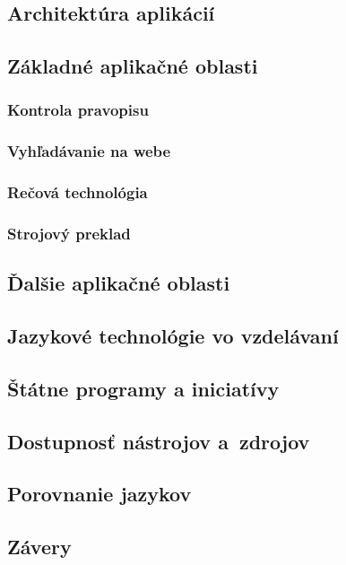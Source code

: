 \documentclass[]{../metanetpaper}
\begin{document}
\begin{multicols}{2}

\subsection{Architektúra aplikácií}

\subsection{Základné aplikačné oblasti}
\subsubsection{Kontrola pravopisu}

\subsubsection{Vyhľadávanie na webe}

\subsubsection{Rečová technológia}

\subsubsection{Strojový preklad}

\subsection{Ďalšie aplikačné oblasti}

\subsection{Jazykové technológie vo vzdelávaní}

\subsection{Štátne programy a iniciatívy}

\subsection{Dostupnosť nástrojov a~zdrojov}

\subsection{Porovnanie jazykov}

\subsection{Závery}

\end{multicols}
\end{document}

